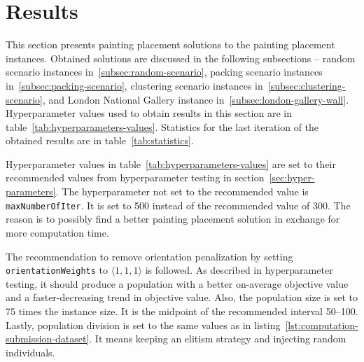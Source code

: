 \clearpage
\newpage


\section{Results}\label{sec:results}
This section presents painting placement solutions to the painting placement instances.
Obtained solutions are discussed in the following subsections –
random scenario instances in~\ref{subsec:random-scenario},
packing scenario instances in~\ref{subsec:packing-scenario},
clustering scenario instances in~\ref{subsec:clustering-scenario},
and London National Gallery instance in~\ref{subsec:london-gallery-wall}.
Hyperparameter values used to obtain results in this section are in table~\ref{tab:hyperparameters-values}.
Statistics for the last iteration of the obtained results are in table~\ref{tab:statistics}.

Hyperparameter values in table~\ref{tab:hyperparameters-values} are set to their recommended values
from hyperparameter testing in section~\ref{sec:hyper-parameters}.
The hyperparameter not set to the recommended value is \verb|maxNumberOfIter|.
It is set to 500 instead of the recommended value of 300.
The reason is to possibly find a better painting placement solution in exchange for more computation time.

The recommendation to remove orientation penalization by setting \verb|orientationWeights| to $\langle 1,1,1\rangle$ is followed.
As described in hyperparameter testing, it should produce a population with a better on-average objective value and a faster-decreasing trend in objective value.
Also, the population size is set to 75 times the instance size.
It is the midpoint of the recommended interval \numrange{50}{100}.
Lastly, population division is set to the same values as in listing~\ref{lst:computation-submission-dataset}.
It means keeping an elitism strategy and injecting random individuals.

